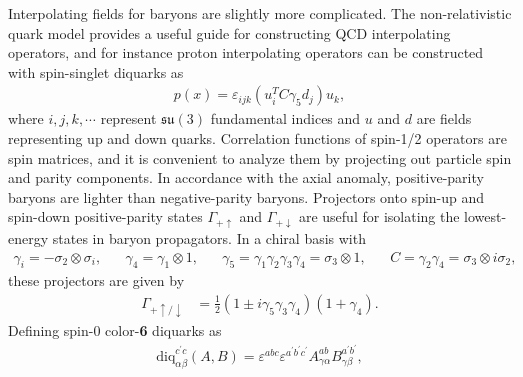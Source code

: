 Interpolating fields for baryons are slightly more complicated.
The non-relativistic quark model provides a useful guide for constructing QCD interpolating operators, and for instance proton interpolating operators can be constructed with spin-singlet diquarks as
\begin{equation}
  \begin{split}
    p(x) = \varepsilon_{ijk}(u_i^T C \gamma_5 d_j)u_k,
  \end{split}\label{eq:protoninterp}
\end{equation}
where $i,j,k,\cdots$ represent $\mathfrak{su}(3)$ fundamental indices and $u$ and $d$ are fields representing up and down quarks.
Correlation functions of spin-1/2 operators are spin matrices, and it is convenient to analyze them by projecting out particle spin and parity components.
In accordance with the axial anomaly, positive-parity baryons are lighter than negative-parity baryons.
Projectors onto spin-up and spin-down positive-parity states $\Gamma_{+\uparrow}$ and $\Gamma_{+\downarrow}$ are useful for isolating the lowest-energy states in baryon propagators.
In a chiral basis with
\begin{equation}
  \begin{split}
    \gamma_i = -\sigma_2\otimes \sigma_i, \hspace{20pt}     \gamma_4 = \gamma_1\otimes 1, \hspace{20pt} \gamma_5 = \gamma_1\gamma_2\gamma_3\gamma_4 = \sigma_3 \otimes 1, \hspace{20pt}C = \gamma_2\gamma_4 = \sigma_3\otimes i\sigma_2,
  \end{split}\label{gammadef}
\end{equation}
these projectors are given by
\begin{equation}
  \begin{split}
    \Gamma_{+\uparrow/\downarrow} &= \frac{1}{2}(1 \pm i \gamma_5\gamma_3\gamma_4)(1 + \gamma_4).
  \end{split}\label{spinprojdef}
\end{equation}
Defining spin-0 color-\textbf{6} diquarks as
\begin{equation}
  \begin{split}
    \text{diq}_{\alpha\beta}^{c^\prime c}(A,B) = \varepsilon^{abc}\varepsilon^{a^\prime b^\prime c^\prime} A_{\gamma \alpha}^{ab}B_{\gamma \beta}^{a^\prime b^\prime},
  \end{split}\label{eq:diquarkdef}
\end{equation}
